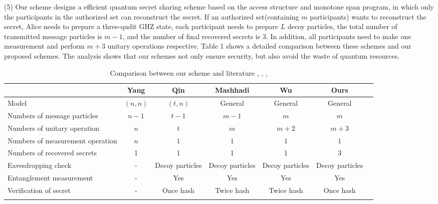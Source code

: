 \documentclass[pdflatex,sn-mathphys]{sn-jnl}%
\theoremstyle{thmstyleone}%
\theoremstyle{thmstyletwo}%
\theoremstyle{thmstylethree}%
\begin{document}
\indent(5) Our scheme designs a efficient quantum secret sharing scheme based on the access structure and monotone span program, in which only the participants in the authorized set can reconstruct the secret. If an authorized set(containing $m$ participants) wants to reconstruct the secret, Alice needs to prepare a three-qudit GHZ state, each participant needs to prepare $L$ decoy particles, the total number of transmitted message particles is $m-1$, and the number of final recovered secrets is $3$. In addition, all participants need to make one measurement and perform $m+3$ unitary operations respective. 
\indent Table 1 shows a detailed comparison between these schemes and our proposed schemes. The analysis shows that our schemes not only ensure security, but also avoid the waste of quantum resources.

\begin{sidewaystable}
\sidewaystablefn%
\begin{center}
\begin{minipage}{\textheight}
\caption{Comparison between our scheme and literature \citep{ref-ur15}, \citep{ref-ur16}, \citep{ref-ur20}, \citep{ref-ur21}}\label{tab1}
\begin{tabular*}{\textheight}{@{\extracolsep{\fill}}lcccccc@{\extracolsep{\fill}}}
\toprule%
 & Yang \citep{ref-ur15}  & Qin \citep{ref-ur16} & Mashhadi \citep{ref-ur20} & Wu \citep{ref-ur21} & Ours\\
\midrule
Model    & $(n,n)$   & $(t,n)$  & General & General & General \\
Numbers of message particles  & $n-1$   & $t-1$  & $m-1$ & $m$& $m$ \\
Numbers of unitary operation  & $n$   & $t$  & $m$ & $m+2$& $m+3$ \\
Numbers of measurement operation  & $n$   & $1$  & $1$ & $1$ & $1$ \\
Numbers of recovered secrets  & 1   & 1  & 1 & 1 & 3 \\
Eavesdropping check  & -   & Decoy particles  & Decoy particles & Decoy particles & Decoy particles \\
Entanglement measurement  & -   & Yes  & Yes  & Yes & Yes\\
Verification of secret  & -   & Once hash  & Twice hash  & Twice hash & Once hash\\
\botrule
\end{tabular*}
\end{minipage}
\end{center}
\end{sidewaystable}
\end{document}
